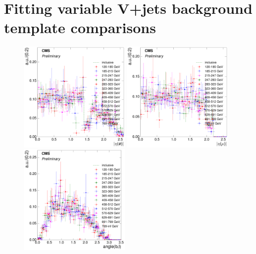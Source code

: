\clearpage


\section{Fitting variable V+jets background template comparisons}
\label{as:fitting_variable_vjets_template_comparisons}

\begin{figure}[hbtp]
    \centering
     \includegraphics[width=0.48\textwidth]{Chapters/04_Analysis/04b_XSections/images/8TeV/fit_variables/electron/HT/electron_absolute_eta/vjets/HT_electron_absolute_eta_2orMoreBtags_VJets_template_comparison.pdf}\hfill
     \includegraphics[width=0.48\textwidth]{Chapters/04_Analysis/04b_XSections/images/8TeV/fit_variables/muon/HT/muon_absolute_eta/vjets/HT_muon_absolute_eta_2orMoreBtags_VJets_template_comparison.pdf}\\
     \includegraphics[width=0.48\textwidth]{Chapters/04_Analysis/04b_XSections/images/8TeV/fit_variables/electron/HT/angle_bl/vjets/HT_angle_bl_2orMoreBtags_VJets_template_comparison.pdf}\hfill

\end{figure}
